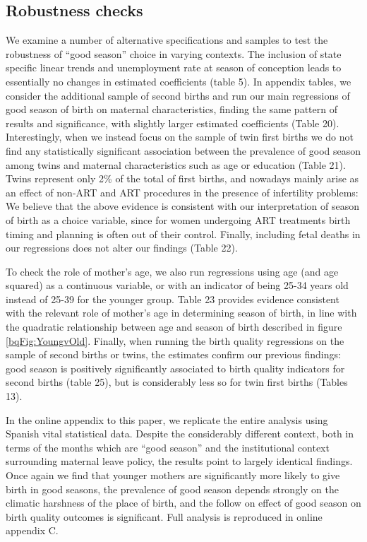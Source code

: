 \documentclass[a4paper, 12 pt]{article}
\theoremstyle{plain}
\begin{document}
\begin{doublespace}
\subsection{Robustness checks}
We examine a number of alternative specifications and samples to test the robustness of ``good season'' choice in varying contexts.  The inclusion of state specific linear trends and unemployment rate at season of conception leads to essentially no changes in estimated coefficients (table 5).  In appendix tables, we consider the additional sample of second births and run our main regressions of good season of birth on maternal characteristics, finding the same pattern of results and significance, with slightly larger estimated coefficients (Table 20). Interestingly, when we instead focus on the sample of twin first births we do not find any statistically significant association between the prevalence of good season among twins and maternal characteristics such as age or education (Table 21). Twins represent only 2\% of the total of first births, and nowadays mainly arise as an effect of non-ART and ART procedures in the presence of infertility problems: We believe that the above evidence is consistent with our interpretation of season of birth as a choice variable, since for women undergoing ART treatments birth timing and planning is often out of their control. Finally, including fetal deaths in our regressions does not alter our findings (Table 22).

To check the role of mother's age, we also run regressions using age (and age squared) as a continuous variable, or with an indicator of being 25-34 years old instead of 25-39 for the younger group. Table 23 provides evidence consistent with the relevant role of mother's age in determining season of birth, in line with the quadratic relationship between age and season of birth described in figure \ref{bqFig:YoungvOld}. Finally, when running the birth quality regressions on the sample of second births or twins, the estimates confirm our previous findings: good season is positively significantly associated to birth quality indicators for second births (table 25), but is considerably less so for twin first births (Tables 13).

In the online appendix to this paper, we replicate the entire analysis using Spanish vital statistical data.  Despite the considerably different context, both in terms of the months which are ``good season'' and the institutional context surrounding maternal leave policy, the results point to largely identical findings.  Once again we find that younger mothers are significantly more likely to give birth in good seasons, the prevalence of good season depends strongly on the climatic harshness of the place of birth, and the follow on effect of good season on birth quality outcomes is significant.  Full analysis is reproduced in online appendix C.



\end{doublespace}
\end{document}
